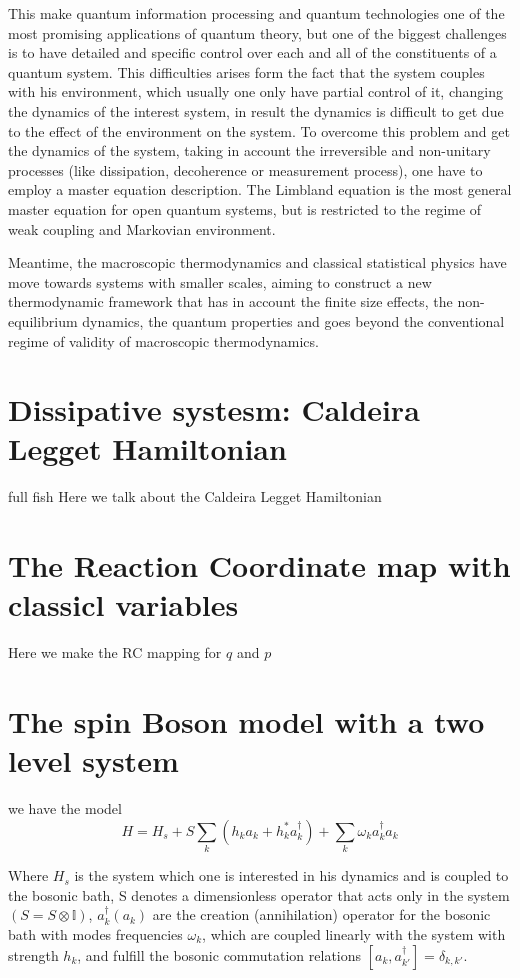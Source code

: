 \documentclass[12pt]{article}
\begin{document}
This make quantum information processing and quantum technologies  one of the most promising applications of quantum theory, but one of the biggest challenges is to have detailed and specific control over each and all of the constituents of a quantum system. This difficulties arises form the fact that the system  couples  with his environment, which usually one only have partial control of it, changing the dynamics of the interest system, in result the dynamics is difficult to get due to the effect of the environment on the system. To overcome this problem and get the dynamics of the system, taking in account the irreversible and non-unitary processes (like dissipation, decoherence or measurement process), one have to employ a master equation description. The Limbland equation is the most general master equation for open quantum systems, but is restricted to the regime of weak coupling and Markovian environment.  


Meantime, the macroscopic thermodynamics and classical statistical physics have move towards systems with smaller scales, aiming to construct a new thermodynamic framework that has in account  the  finite  size  effects,  the  non-equilibrium  dynamics, the quantum properties and goes beyond the conventional regime of validity of macroscopic  thermodynamics.  


\section{Dissipative systesm: Caldeira Legget Hamiltonian}
full fish
Here we talk about the  Caldeira Legget Hamiltonian 

\section{The Reaction Coordinate map with classicl variables}
Here we make the RC mapping for $q$ and $p$


\section{The spin Boson model with a two level system }
 we have the model 
\begin{equation}
    H=H_s + S \sum_{k} \left( h_k a_k + h_k^* a_k^{\dagger} \right) + \sum_k \omega_k a_k^{\dagger} a_k
\label{Original H}    
\end{equation} 

Where $H_s$ is the system which one is interested in his dynamics and is coupled to the bosonic bath, S denotes a dimensionless operator that acts only in the system $(S= S \otimes \mathbb{I})$, $a_k^{\dagger} (a_k)$ are the creation (annihilation) operator for the bosonic bath with modes frequencies $\omega_k$, which are coupled linearly with the  system with strength $h_k$, and fulfill the bosonic commutation relations $ \left[ a_k , a_{k'}^{\dagger} \right] = \delta_{k,k'}  $.
\end{document}
